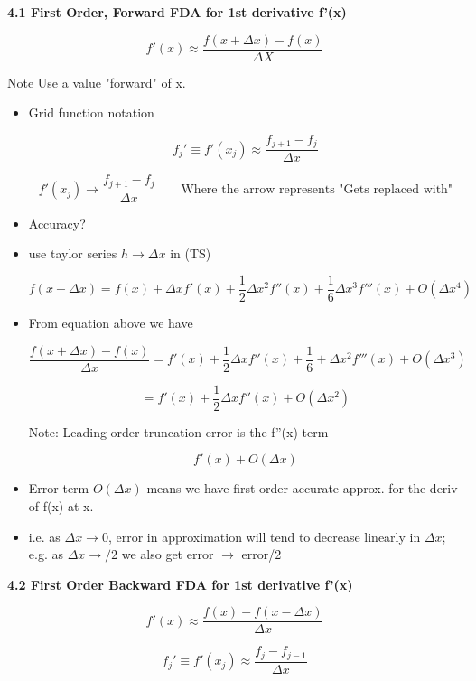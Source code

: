 \textbf{4.1 First Order, Forward FDA for 1st derivative f'(x)}

\[ f'(x) \approx \frac{f(x+\Delta x)-f(x)}{\Delta X}\]

Note Use a value "forward" of x.

\begin{itemize}
    \item Grid function notation

    \[ f_j' \equiv f'(x_j) \approx \frac{f_{j+1} - f_j}{\Delta x}\]

    \begin{equation}
        f'(x_j) \rightarrow \frac{f_{j+1}-f_j}{\Delta x} \qquad \text{Where the arrow represents "Gets replaced with"}
    \end{equation}

    \item Accuracy?

    \item use taylor series $h\rightarrow\Delta x$ in (TS)

    \[f(x+\Delta x) = f(x) + \Delta x f'(x) + \frac{1}{2} \Delta x^2 f''(x) + \frac{1}{6} \Delta x^3 f'''(x) + O(\Delta x^4) \]

    \item From equation above we have 

    \[ \frac{f(x+\Delta x)-f(x)}{\Delta x} = f'(x) + \frac{1}{2} \Delta x f''(x) + \frac{1}{6} + \Delta x^2 f'''(x) + O(\Delta x^3)\]

    \[ =  f'(x) + \frac{1}{2} \Delta x f''(x) + O(\Delta x^2)\]

    Note: Leading order truncation error is the f''(x) term

    \[ f'(x) + O(\Delta x)\]

    \item Error term $ O(\Delta x) $ means we have first order accurate approx. for the deriv of f(x) at x.

    \item i.e. as $\Delta x \rightarrow 0 $, error in approximation will tend to decrease linearly in $\Delta x$; e.g. as $\Delta x \rightarrow/2 $ we also get error $\rightarrow$ error/2
    
\end{itemize}

\textbf{4.2 First Order Backward FDA for 1st derivative f'(x)}

\[ f'(x) \approx \frac{f(x)-f(x-\Delta x)}{\Delta x}\]

\[ f_j' \equiv f'(x_j) \approx \frac{f_j-f_{j-1}}{\Delta x}\]

